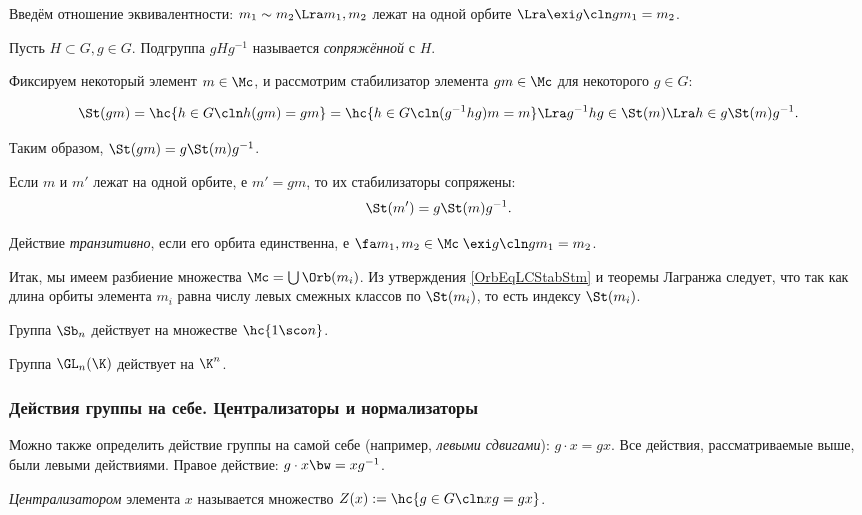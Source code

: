 \documentclass[a4paper]{article}
\begin{document}
Введём отношение эквивалентности: $m_1 \sim m_2 \Lra m_1, m_2$ лежат на одной орбите $\Lra \exi g\cln gm_1=m_2$.

\begin{df}
Пусть $H \subset G, g \in G$. Подгруппа $gHg^{-1}$ называется \emph{сопряжённой} с $H$.
\end{df}

Фиксируем некоторый элемент $m \in \Mc$, и рассмотрим стабилизатор элемента $gm \in \Mc$ для некоторого $g \in G$:

$$\St(gm)=\hc{h \in G\cln h(gm)= gm} = \hc{h \in G\cln (g^{-1}hg)m=m} \Lra g^{-1}hg \in \St(m) \Lra h \in g\St(m)g^{-1}.$$

Таким образом, $\St(gm)=g\St(m)g^{-1}$.
\begin{imp}
Если $m$ и $m'$ лежат на одной орбите, е $m'=gm$, то их стабилизаторы сопряжены:
$$\St(m')= g\St(m)g^{-1}.$$
\end{imp}

\begin{df}
Действие \emph{транзитивно}, если его орбита единственна, е $\fa m_1, m_2 \in \Mc \; \exi g\cln gm_1=m_2$.
\end{df}

Итак, мы имеем разбиение множества $\Mc=\bigcup\Orb(m_i)$. Из утверждения \ref{OrbEqLCStabStm}
и теоремы Лагранжа следует, что
так как длина орбиты элемента $m_i$ равна числу левых смежных классов по $\St(m_i)$, то есть индексу $\St(m_i)$.

\begin{ex}
Группа $\Sb_n$ действует на множестве $\hc{1 \sco n}$.
\end{ex}

\begin{ex}
Группа $\GL_n(\K)$ действует на $\K^n$.
\end{ex}

\subsubsection{Действия группы на себе. Централизаторы и нормализаторы}
Можно также определить действие группы на самой себе (например, \emph{\emph{левыми сдвигами}}): $g\cdot x = gx$.
Все действия, рассматриваемые выше, были левыми действиями. Правое действие: $g\cdot x \bw= xg^{-1}$.

\begin{df}
\emph{Централизатором} элемента $x$ называется множество $Z(x):=\hc{g \in G\cln xg=gx}$.
\end{df}
\end{document}

